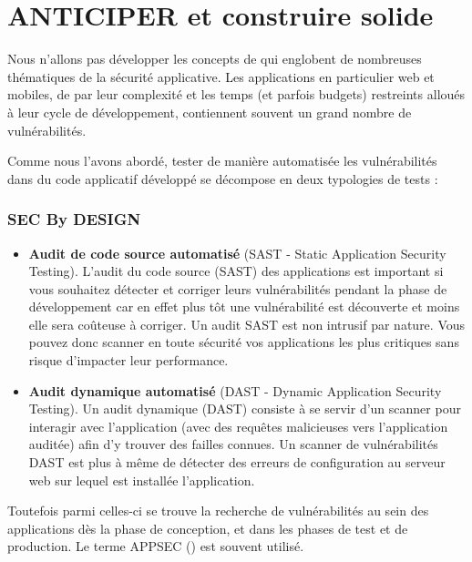 
\section{ANTICIPER et construire solide}

Nous n'allons pas développer les concepts de  qui  englobent de nombreuses thématiques de la sécurité applicative.
Les applications en particulier web et mobiles, de par leur complexité et les temps (et parfois budgets) restreints alloués à leur cycle de développement, contiennent souvent un grand nombre de vulnérabilités.

Comme nous l'avons abordé, tester de manière automatisée les vulnérabilités dans du code applicatif développé se décompose en deux typologies de tests :

\begin{frame}
\frametitle<presentation>{SEC By DESIGN}
\begin{itemize}
  \item  \textbf{Audit de code source automatisé} (SAST - Static Application Security Testing). L’audit du code source (SAST) des applications est important si vous souhaitez détecter et corriger leurs vulnérabilités pendant la phase de développement car en effet plus tôt une vulnérabilité est découverte et moins elle sera coûteuse à corriger.
Un audit SAST est non intrusif par nature. Vous pouvez donc scanner en toute sécurité vos applications les plus critiques sans risque d’impacter leur performance.
  \item   \textbf{Audit dynamique automatisé }(DAST - Dynamic Application Security Testing). Un audit dynamique (DAST) consiste à se servir d’un scanner pour interagir avec l’application (avec des requêtes malicieuses vers l’application auditée)  afin d’y trouver des failles connues.
Un scanner de vulnérabilités DAST est plus à même de détecter des erreurs de configuration au serveur web sur lequel est installée l’application.

\end{itemize}
\end{frame}

Toutefois parmi celles-ci se trouve la recherche de vulnérabilités au sein des applications dès la phase de conception, et dans les phases de test et de production. Le terme APPSEC () est souvent utilisé.

